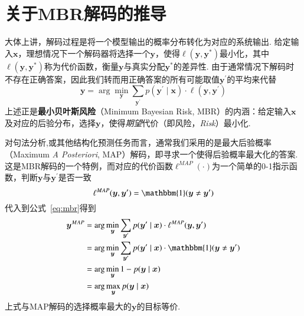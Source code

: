 \chapter{关于MBR解码的推导}
\label{cha:mbr-decoding}
大体上讲，解码过程是将一个模型输出的概率分布转化为对应的系统输出.
给定输入$\boldsymbol{x}$，理想情况下一个解码器将选择一个$\boldsymbol{y}$，使得$\ell(\boldsymbol{y},\boldsymbol{y}^{\ast})$最小化，其中$\ell(\boldsymbol{y},\boldsymbol{y}^{\ast})$称为代价函数，衡量$\boldsymbol{y}$与真实分配$\boldsymbol{y}^{\ast}$的差异性.
由于通常情况下解码时不存在正确答案，因此我们转而用正确答案的所有可能取值$\boldsymbol{y}^{\prime}$的平均来代替
\begin{equation}
  \label{eq:mbr}
  \boldsymbol{y}= \arg\min_{\boldsymbol{y}}\sum_{\boldsymbol{y}^{\prime}}p(\boldsymbol{y}^{\prime}\mid\boldsymbol{x})\cdot\ell(\boldsymbol{y},\boldsymbol{y}^{\prime})
\end{equation}
上述正是\textbf{最小贝叶斯风险}（Minimum Bayesian Risk, MBR）的内涵：给定输入$\boldsymbol{x}$及对应的后验分布，选择$\boldsymbol{y}$，使得\textit{期望}代价（即风险，\textit{Risk}）最小化\citep{stoyanov-eisner-2012-minimum}.

对句法分析,或其他结构化预测任务而言，通常我们采用的是最大后验概率（Maximum \textit{A Posteriori}, MAP）解码，即寻求一个使得后验概率最大化的答案.
这是MBR解码的一个特例，而对应的代价函数$\ell^{MAP}(\cdot)$为一个简单的0-1指示函数，判断$\boldsymbol{y}$与$\boldsymbol{y}^{\prime}$是否一致
\begin{equation}
  \ell^{MAP}(\boldsymbol{y},\boldsymbol{y}^{\prime}) = \mathbbm{1}(\boldsymbol{y}\neq\boldsymbol{y}^{\prime})
\end{equation}
代入到公式~\ref{eq:mbr}得到
\begin{equation}
  \label{eq:map}
  \begin{split}
    \boldsymbol{y}^{MAP}&= \arg\min_{\boldsymbol{y}}\sum_{\boldsymbol{y}^{\prime}}p(\boldsymbol{y}^{\prime}\mid\boldsymbol{x})\cdot\ell^{MAP}(\boldsymbol{y},\boldsymbol{y}^{\prime})\\
    &=\arg\min_{\boldsymbol{y}}\sum_{\boldsymbol{y}^{\prime}}p(\boldsymbol{y}^{\prime}\mid\boldsymbol{x})\cdot\mathbbm{1}(\boldsymbol{y}\neq\boldsymbol{y}^{\prime})\\
    &=\arg\min_{\boldsymbol{y}} 1-p(\boldsymbol{y}\mid\boldsymbol{x})\\
    &=\arg\max_{\boldsymbol{y}}p(\boldsymbol{y}\mid\boldsymbol{x})
  \end{split}
\end{equation}
上式与MAP解码的选择概率最大的$\boldsymbol{y}$的目标等价.

